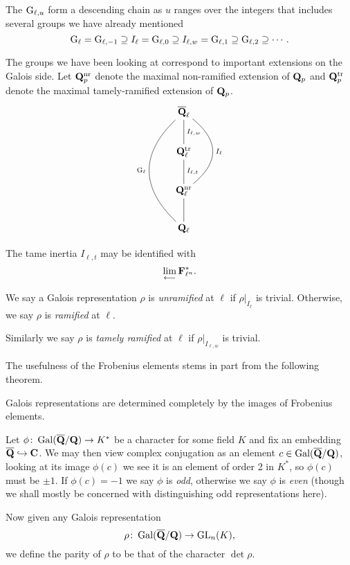 \documentclass[a4paper,12pt]{article}
\begin{document}
The $\mathrm{G}_{\ell,u}$ form a descending chain as $u$ ranges over the integers that includes several groups we have already mentioned
\[
\mathrm{G}_\ell = \mathrm{G}_{\ell,-1} \supseteq I_\ell = \mathrm{G}_{\ell,0} \supseteq  I_{\ell,w} = \mathrm{G}_{\ell,1} \supseteq\mathrm{G}_{\ell, 2}\supseteq\cdots.
\]

The groups we have been looking at correspond to important extensions on the Galois side. %
Let $\mathbf{Q}_p^{\mathrm{nr}}$ denote the maximal non-ramified extension of $\mathbf{Q}_p$ and $\mathbf{Q}_p^{\mathrm{tr}}$ denote the maximal tamely-ramified extension of $\mathbf{Q}_p$. %
\[
\xymatrix{
\Qlb      \ar@{-}[d]^{I_{\ell,w}} \ar@{-}@/_3pc/[ddd]_{\Gl} \ar@{-}@/^2.5pc/[dd]^{I_{\ell}}\\
\Ql^\tamr \ar@{-}[d]^{I_{\ell,t}} \\
\Ql^\nr   \ar@{-}[d] \\
\Ql
}
\]

The tame inertia $I_{\ell,t}$ may be identified with
\[
\lim_{\longleftarrow} \mathbf{F}_{\ell^n}^*.
\] %

\begin{defn}
We say a Galois representation $\rho$ is \emph{unramified} at $\ell$ if $\rho|_{I_\ell}$ is trivial.
Otherwise, we say $\rho$ is \emph{ramified} at $\ell$.

Similarly we say $\rho$ is \emph{tamely ramified} at $\ell$ if $\rho|_{I_{\ell,w}}$ is trivial.
\end{defn}

The usefulness of the Frobenius elements stems in part from the following theorem.

\begin{thm}\label{thm:cheb}
Galois representations are determined completely by the images of Frobenius elements. %
\end{thm}

\begin{defn}
Let $\phi\colon\operatorname{Gal}(\overline{\mathbf{Q}}/\mathbf{Q}) \to K^*$ be a character for some field $K$ and fix an embedding $\overline{\mathbf{Q}}\hookrightarrow \mathbf{C}$.
We may then view complex conjugation as an element $c\in \operatorname{Gal}(\overline{\mathbf{Q}}/\mathbf{Q})$, looking at its image $\phi(c)$ we see it is an element of order 2 in $K^*$, so $\phi(c)$ must be $\pm 1$.
If $\phi(c) = -1$ we say $\phi$ is \emph{odd}, otherwise we say $\phi$ is \emph{even} (though we shall mostly be concerned with distinguishing odd representations here).

Now given any Galois representation
\[
\rho\colon\operatorname{Gal}(\overline{\mathbf{Q}}/\mathbf{Q}) \to \operatorname{GL}_n(K),
\]
we define the parity of $\rho$ to be that of the character $\det\rho$.
\end{defn}
\end{document}
